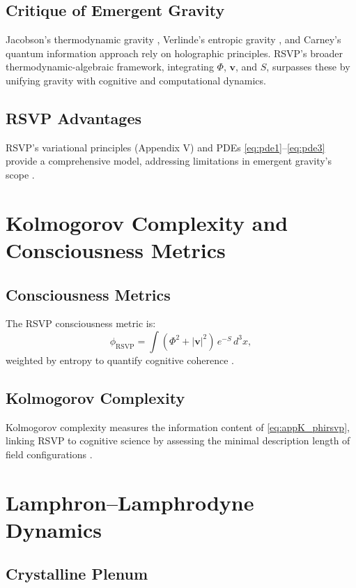 \documentclass[12pt]{report}
\newcommand{\PhiRSVP}{\Phi}
\newcommand{\vRSVP}{\mathbf{v}}
\newcommand{\SRSVP}{S}
\newcommand{\phirsvp}{\phi_{\text{RSVP}}}
\begin{document}
\section{Critique of Emergent Gravity}
Jacobson’s thermodynamic gravity \citep{Jacobson1995}, Verlinde’s entropic gravity \citep{Verlinde2011}, and Carney’s quantum information approach \citep{Carney2019} rely on holographic principles. RSVP’s broader thermodynamic-algebraic framework, integrating \(\PhiRSVP\), \(\vRSVP\), and \(\SRSVP\), surpasses these by unifying gravity with cognitive and computational dynamics.

\section{RSVP Advantages}
RSVP’s variational principles (Appendix V) and PDEs \eqref{eq:pde1}--\eqref{eq:pde3} provide a comprehensive model, addressing limitations in emergent gravity’s scope \citep{RSVPMeta2025}.

\chapter{Kolmogorov Complexity and Consciousness Metrics}
\label{app:K}
\section{Consciousness Metrics}
The RSVP consciousness metric is:
\begin{equation}
\phirsvp = \int (\PhiRSVP^2 + |\vRSVP|^2) \, e^{-\SRSVP} \, d^3x, \label{eq:appK_phirsvp}
\end{equation}
weighted by entropy to quantify cognitive coherence \citep{RSVPMeta2025}.

\section{Kolmogorov Complexity}
Kolmogorov complexity measures the information content of \eqref{eq:appK_phirsvp}, linking RSVP to cognitive science by assessing the minimal description length of field configurations \citep{Kolmogorov1965}.

\chapter{Lamphron--Lamphrodyne Dynamics}
\label{app:L}

\section{Crystalline Plenum}
\end{document}
